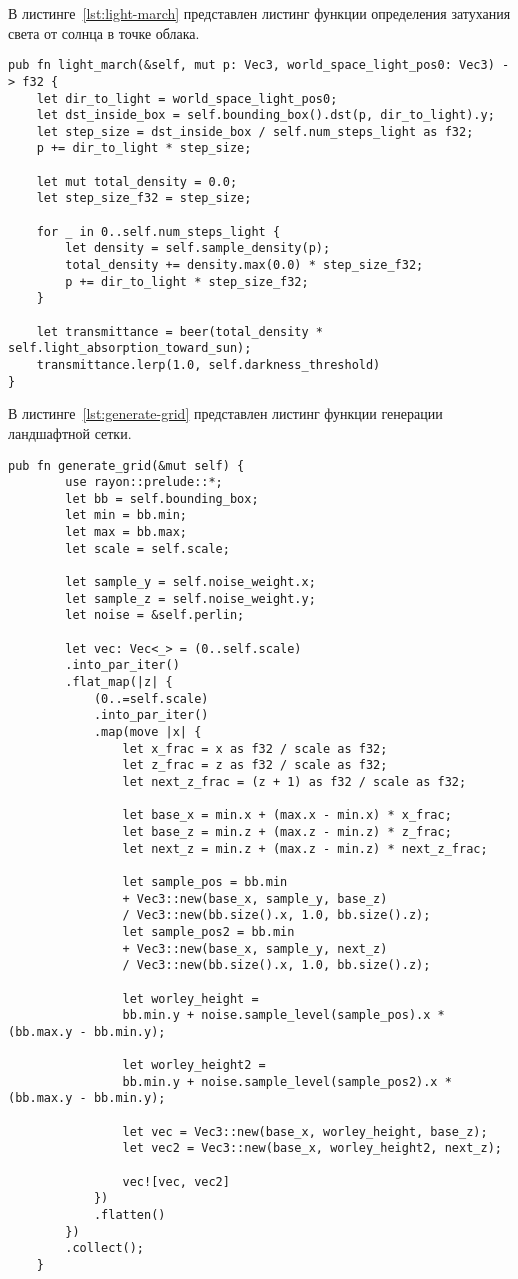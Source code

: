 \newpage
В листинге~\ref{lst:light-march} представлен листинг функции определения затухания света от солнца в точке облака.
\begin{lstlisting}[style=rust, caption={Определение затухания света от солнца в точке облака.},label={lst:light-march}]
pub fn light_march(&self, mut p: Vec3, world_space_light_pos0: Vec3) -> f32 {
	let dir_to_light = world_space_light_pos0;
	let dst_inside_box = self.bounding_box().dst(p, dir_to_light).y;
	let step_size = dst_inside_box / self.num_steps_light as f32;
	p += dir_to_light * step_size;
	
	let mut total_density = 0.0;
	let step_size_f32 = step_size;
	
	for _ in 0..self.num_steps_light {
		let density = self.sample_density(p);
		total_density += density.max(0.0) * step_size_f32;
		p += dir_to_light * step_size_f32;
	}
	
	let transmittance = beer(total_density * self.light_absorption_toward_sun);
	transmittance.lerp(1.0, self.darkness_threshold)
}
\end{lstlisting}

В листинге~\ref{lst:generate-grid}  представлен листинг функции генерации ландшафтной сетки.
\begin{lstlisting}[style=rust, caption={Функция генерации ландшафтной сетки.},label={lst:generate-grid}]
	pub fn generate_grid(&mut self) {
		use rayon::prelude::*;
		let bb = self.bounding_box;
		let min = bb.min;
		let max = bb.max;
		let scale = self.scale;
		
		let sample_y = self.noise_weight.x;
		let sample_z = self.noise_weight.y;
		let noise = &self.perlin;
		
		let vec: Vec<_> = (0..self.scale)
		.into_par_iter()
		.flat_map(|z| {
			(0..=self.scale)
			.into_par_iter()
			.map(move |x| {
				let x_frac = x as f32 / scale as f32;
				let z_frac = z as f32 / scale as f32;
				let next_z_frac = (z + 1) as f32 / scale as f32;
				
				let base_x = min.x + (max.x - min.x) * x_frac;
				let base_z = min.z + (max.z - min.z) * z_frac;
				let next_z = min.z + (max.z - min.z) * next_z_frac;
				
				let sample_pos = bb.min
				+ Vec3::new(base_x, sample_y, base_z)
				/ Vec3::new(bb.size().x, 1.0, bb.size().z);
				let sample_pos2 = bb.min
				+ Vec3::new(base_x, sample_y, next_z)
				/ Vec3::new(bb.size().x, 1.0, bb.size().z);
				
				let worley_height =
				bb.min.y + noise.sample_level(sample_pos).x * (bb.max.y - bb.min.y);
				
				let worley_height2 =
				bb.min.y + noise.sample_level(sample_pos2).x * (bb.max.y - bb.min.y);
				
				let vec = Vec3::new(base_x, worley_height, base_z);
				let vec2 = Vec3::new(base_x, worley_height2, next_z);
				
				vec![vec, vec2]
			})
			.flatten()
		})
		.collect();
	}
\end{lstlisting}

